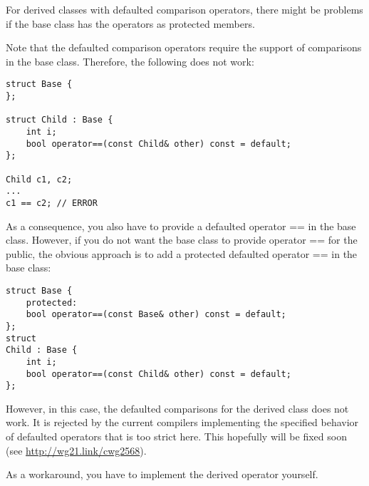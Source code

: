 For derived classes with defaulted comparison operators, there might be problems if the base class has the operators as protected members.

Note that the defaulted comparison operators require the support of comparisons in the base class. Therefore, the following does not work:

\begin{lstlisting}[style=styleCXX]
struct Base {
};

struct Child : Base {
	int i;
	bool operator==(const Child& other) const = default;
};

Child c1, c2;
...
c1 == c2; // ERROR
\end{lstlisting}

As a consequence, you also have to provide a defaulted operator == in the base class. However, if you do not want the base class to provide operator == for the public, the obvious approach is to add a protected defaulted operator == in the base class:

\begin{lstlisting}[style=styleCXX]
struct Base {
	protected:
	bool operator==(const Base& other) const = default;
};
struct 
Child : Base {
	int i;
	bool operator==(const Child& other) const = default;
};
\end{lstlisting}

However, in this case, the defaulted comparisons for the derived class does not work. It is rejected by the current compilers implementing the specified behavior of defaulted operators that is too strict here. This hopefully will be fixed soon (see \url{http://wg21.link/cwg2568}).

As a workaround, you have to implement the derived operator yourself.




